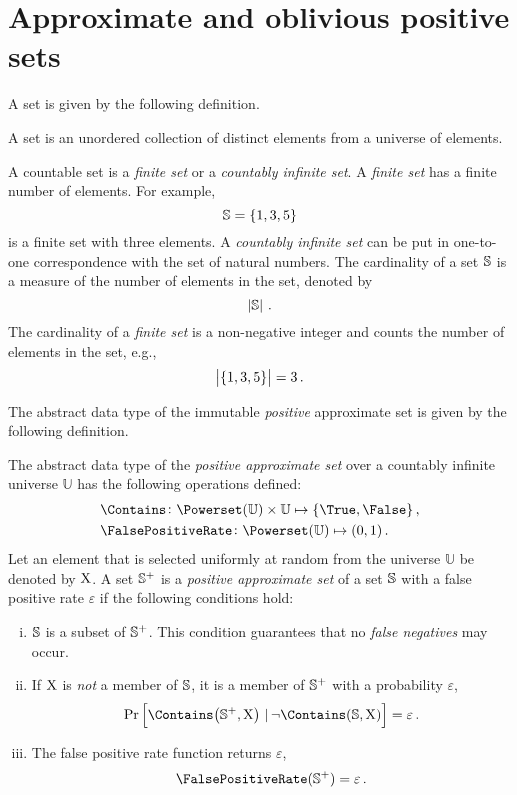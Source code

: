 \documentclass[ ../main.tex]{subfiles}
\begin{document}
\section{Approximate and oblivious positive sets}
A set is given by the following definition.
\begin{definition}
A set is an unordered collection of distinct elements from a universe of elements.
\end{definition}
A countable set is a \emph{finite set} or a \emph{countably infinite set}. A \emph{finite set} has a finite number of elements. For example,
\[
    \mathbb{S} = \{ 1, 3, 5 \}
\]
is a finite set with three elements. A \emph{countably infinite set} can be put in one-to-one correspondence with the set of natural numbers. The cardinality of a set $\mathbb{S}$ is a measure of the number of elements in the set, denoted by
\begin{equation}
    \left\vert{\mathbb{\mathbb{S}}}\right\vert\,.
\end{equation}
The cardinality of a \emph{finite set} is a non-negative integer and counts the number of elements in the set, e.g.,
\[
    \left\vert{\left\{ 1, 3, 5\right\}}\right\vert = 3\,.
\]

The abstract data type of the immutable \emph{positive} approximate set\cite{aset} is given by the following definition.
\begin{definition}
\label{def:approx_set}
The abstract data type of the \emph{positive approximate set} over a countably infinite universe $\mathbb{U}$ has the following operations defined:
\begin{align}
    &\Contains \colon \Powerset(\mathbb{U}) \times \mathbb{U} \mapsto \{ \True, \False \}\,,\\
    &\FalsePositiveRate \colon \Powerset(\mathbb{U}) \mapsto (0,1)\,.
\end{align}
Let an element that is selected uniformly at random from the universe $\mathbb{U}$ be denoted by $\mathrm{X}$. A set $\mathbb{S}^+$ is a \emph{positive approximate set} of a set $\mathbb{S}$ with a false positive rate $\varepsilon$ if the following conditions hold:
\begin{enumerate}[(i)]
    \item $\mathbb{S}$ is a subset of $\mathbb{S}^+$. This condition guarantees that no \emph{false negatives} may occur.
    \item If $\mathrm{X}$ is \emph{not} a member of $\mathbb{S}$, it is a member of $\mathbb{S}^+$ with a probability $\varepsilon$,
    \begin{equation}
        \Pr\left[\Contains\!\left(\Sp,\rv{X}\right) \given \neg \Contains\!\left(\St,\rv{X}\right)\right] = \varepsilon\,.
    \end{equation}
    \item The false positive rate function returns $\varepsilon$,
    \begin{equation}
         \FalsePositiveRate(\Sp) = \varepsilon\,.
    \end{equation}
\end{enumerate}
\end{definition}
\end{document}
